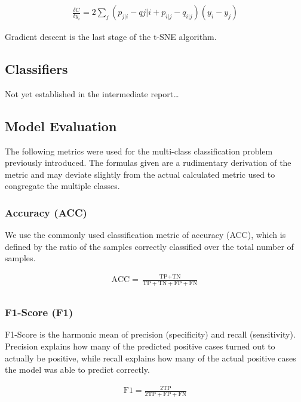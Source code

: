 \documentclass[12pt]{article}
\begin{document}
\begin{align*}
\frac{\delta C}{\delta y_i} = 2\sum_j (p_{j|i}-q{j|i}+p_{i|j}-q_{i|j})(y_i-y_j)
\end{align*}

Gradient descent is the last stage of the t-SNE algorithm.

\subsection{Classifiers}

Not yet established in the intermediate report…

\subsection{Model Evaluation}

The following metrics were used for the multi-class classification problem previously introduced. The formulas given are a rudimentary derivation of the metric and may deviate slightly from the actual calculated metric used to congregate the multiple classes.

\subsubsection{Accuracy (ACC)}

We use the commonly used classification metric of accuracy (ACC), which is defined by the ratio of the samples correctly classified over the total number of samples.

\begin{align*}
    \text{ACC} = \frac{\text{TP} + \text{TN}}{\text{TP} + \text{TN} + \text{FP} + \text{FN}} \\ 
\end{align*}

\subsubsection{F1-Score (F1)}

F1-Score is the harmonic mean of precision (specificity) and recall (sensitivity). Precision explains how many of the predicted positive cases turned out to actually be positive, while recall explains how many of the actual positive cases the model was able to predict correctly. 

\begin{align*}
    \text{F1} = \frac{2\text{TP}}{2\text{TP} + \text{FP} + \text{FN}} \\ 
\end{align*}
\end{document}
